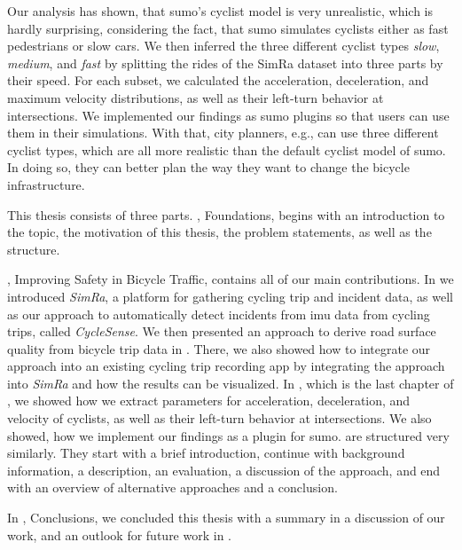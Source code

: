 \begin{itemize}
Our analysis has shown, that \ac{sumo}'s cyclist model is very unrealistic, which is hardly surprising, considering the fact, that \ac{sumo} simulates cyclists either as fast pedestrians or slow cars.
We then inferred the three different cyclist types \textit{slow}, \textit{medium}, and \textit{fast} by splitting  the rides of the SimRa dataset into three parts by their speed.
For each subset, we calculated the acceleration, deceleration, and maximum velocity distributions, as well as their left-turn behavior at intersections.
We implemented our findings as \ac{sumo} plugins so that users can use them in their simulations.
With that, city planners, e.g., can use three different cyclist types, which are all more realistic than the default cyclist model of \ac{sumo}.
In doing so, they can better plan the way they want to change the bicycle infrastructure. 
\end{itemize}

This thesis consists of three parts. , Foundations, begins with an introduction to the topic, the motivation of this thesis, the problem statements, as well as the structure.

, Improving Safety in Bicycle Traffic, contains all of our main contributions.
In  we introduced \textit{SimRa}, a platform for gathering cycling trip and incident data, as well as our approach to automatically detect incidents from \ac{imu} data from cycling trips, called \textit{CycleSense}.
We then presented an approach to derive road surface quality from bicycle trip data in .
There, we also showed how to integrate our approach into an existing cycling trip recording app by integrating the approach into \textit{SimRa} and how the results can be visualized.
In , which is the last chapter of , we showed how we extract parameters for acceleration, deceleration, and velocity of cyclists, as well as their left-turn behavior at intersections.
We also showed, how we implement our findings as a plugin for \ac{sumo}.
 are structured very similarly.
They start with a brief introduction, continue with background information, a description, an evaluation, a discussion of the approach, and end with an overview of alternative approaches and a conclusion.

In , Conclusions, we concluded this thesis with a summary in  a discussion of our work, and an outlook for future work in .

